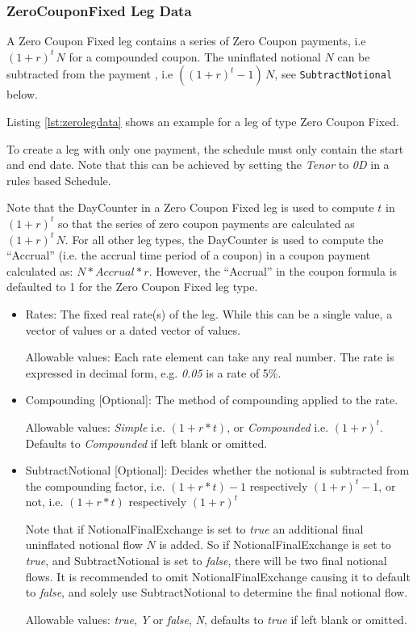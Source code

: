 \subsubsection{ZeroCouponFixed Leg Data}
\label{ss:zerolegdata}

A Zero Coupon Fixed leg contains a series of Zero Coupon payments, i.e $(1 + r)^t \,N$ for a compounded coupon. The uninflated notional $N$ can be subtracted from the payment , i.e $((1 + r)^t-1) \,N$, see \lstinline!SubtractNotional! below.

Listing \ref{lst:zerolegdata} shows an example for a leg of type Zero Coupon Fixed. 

To create a leg with only one payment, the schedule must only contain the start and end date. Note that this can be achieved by setting the \emph{Tenor} to \emph{0D} in a rules based Schedule. 

Note that the DayCounter in a Zero Coupon Fixed leg is used to compute $t$ in $(1+r)^t$ so that the series of zero coupon payments are calculated as $(1 + r)^t \,N$. For all other leg types, the DayCounter is used to compute the “Accrual” (i.e. the accrual time period of a coupon) in a coupon payment calculated as: $N * Accrual * r$. However, the “Accrual” in the coupon formula is defaulted to 1 for the Zero Coupon Fixed leg type.

\begin{itemize}
\item Rates: The fixed real rate(s) of the leg. While this can be a single value, a vector of values or a dated vector of
  values. 
 
 Allowable values: Each rate element can take any  real number. The rate is
  expressed in decimal form, e.g. \emph{0.05} is a rate of 5\%.
\item Compounding [Optional]:  The method of compounding applied to the rate.

Allowable values: \emph{Simple} i.e. $(1 + r * t)$, or \emph{Compounded} i.e. $(1 + r)^t$. Defaults to \emph{Compounded} if left blank or omitted. 


\item SubtractNotional [Optional]:  Decides whether the notional is
  subtracted from the compounding factor,  i.e. $(1 + r * t)  - 1$
  respectively  $(1 + r)^t - 1$, or not, i.e. $(1 + r * t)$  respectively  $(1 + r)^t$

Note that if NotionalFinalExchange is set to  \emph{true} an additional final uninflated notional flow $N$ is added. So if NotionalFinalExchange is set to \emph{true}, and SubtractNotional is set to \emph{false}, there will be two final notional flows. It is recommended to omit NotionalFinalExchange causing it to default to \emph{false}, and solely use SubtractNotional to determine the final notional flow.

Allowable values: \emph{true},  \emph{Y} or \emph{false}, \emph{N}, defaults to \emph{true} if left blank or omitted. 

\end{itemize}

